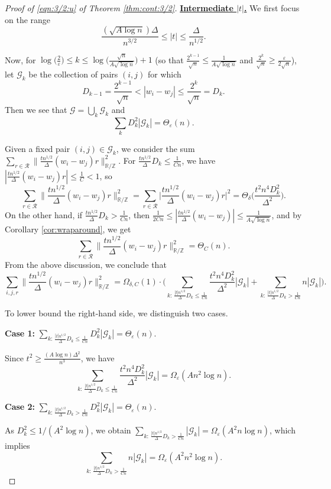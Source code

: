 \documentclass[reqno]{amsart}
\newcommand\R{{\mathbb{R}}}
\newcommand\Z{{\mathbb{Z}}}
\newcommand\eps{{\varepsilon}}
\newcommand\CG{{\mathcal G}}
\newcommand\CR{{\mathcal R}}
\theoremstyle{plain}
\theoremstyle{definition}
\begin{document}
\begin{proof}[Proof of \eqref{eqn:3/2:u} of Theorem \ref{thm:cont:3/2}]
\underline{\bf Intermediate $|t|$.}  
We first focus on the range
\[
\frac{(\sqrt{A\log n})\Delta}{n^{3/2}} \le |t| \le \frac{\Delta}{n^{1/2}}.
\]

Now, for $\log \big(\frac{2}{\eps}\big)\le k \le \log\Big( \frac{\sqrt{n}}{A \sqrt{\log n}} \Big)+1$ (so that $\frac{2^{k-1}}{\sqrt{n}} \le \frac{1}{A\sqrt{\log n}}$ and $\frac{2^{k}}{\sqrt{n}} \ge \frac{\eps}{2\sqrt{n}}$), let $\CG_{k}$ be the collection of pairs $(i,j)$ for which
\[
D_{k-1} = \frac{2^{k-1}}{\sqrt{n}} < |w_{i}-w_{j}| \le \frac{2^{k}}{\sqrt{n}} = D_{k}.
\]
Then we see that $\CG=\bigcup_{k}\CG_{k}$ and
\[
\sum_{k} D_{k}^{2} |\CG_{k}| =\Theta_{\eps}(n).
\]

Given a fixed pair $(i,j)\in \CG_{k}$, we consider the sum $\sum_{r\in \CR} \|\frac{t n^{1/2}}{\Delta} (w_{i}-w_{j})r\|_{\R/\Z}^{2}$. For $\frac{t n^{1/2}}{\Delta}D_{k}\le \frac{1}{C n}$, we have $|\frac{t n^{1/2}}{\Delta} (w_{i}-w_{j})r|\le \frac{1}{C}<1$, so
\[
\sum_{r\in \CR}\Big\|\frac{t n^{1/2}}{\Delta} (w_{i}-w_{j})r\Big\|^{2}_{\R/\Z} = \sum_{r\in \CR}\Big|\frac{t n^{1/2}}{\Delta} (w_{i}-w_{j})r\Big|^2 =\Theta_{\delta} \Big(\frac{t^{2}n^{4}D^{2}_{k}}{\Delta^{2}}\Big).
\]
On the other hand, if $\frac{tn^{1/2}}{\Delta}D_{k}> \frac{1}{Cn}$, then $\frac{1}{2Cn}\le |\frac{tn^{1/2}}{\Delta}(w_{i}-w_{j})|\le \frac{1}{A\sqrt{\log n}}$, and by Corollary \ref{cor:wraparound}, we get
\[
\sum_{r\in \CR} \Big\|\frac{tn^{1/2}}{\Delta} (w_{i}-w_{j})r\Big\|_{\R/\Z}^{2} =\Theta_{C}(n).
\]
From the above discussion, we conclude that
\[
\sum_{i,j,r} \Big\|\frac{tn^{1/2}}{\Delta} (w_{i}-w_{j})r\Big\|_{\R/\Z}^{2}
=\Omega_{\delta,C}(1)\cdot
\Big(
\sum_{k: \, \frac{|t|n^{1/2}}{\Delta}D_{k} \le \frac{1}{Cn}} \frac{t^2 n^{4} D_{k}^{2}}{\Delta^2} |\CG_{k}|
+ \sum_{k: \, \frac{|t|n^{1/2}}{\Delta}D_{k}>\frac{1}{Cn}} n |\CG_{k}|\Big).
\]

To lower bound the right-hand side, we distinguish two cases.

\medskip
\noindent\textbf{Case 1:} $\sum_{k: \, \frac{|t|n^{1/2}}{\Delta}D_{k} \le \frac{1}{Cn}} D_{k}^{2} |\CG_{k}| =\Theta_{\eps}(n)$.

Since $t^2 \ge \frac{(A\log n)\Delta^{2}}{n^{3}}$, we have
\[
\sum_{k: \, \frac{|t|n^{1/2}}{\Delta}D_{k} \le \frac{1}{Cn}} \frac{t^2 n^{4} D_{k}^{2}}{\Delta^{2}} |\CG_{k}|
=\Omega_{\eps}(An^{2}\log n).
\]

\medskip
\noindent\textbf{Case 2:} $\sum_{k:\, \frac{|t|n^{1/2}}{\Delta}D_{k} > \frac{1}{Cn}} D_{k}^{2} |\CG_{k}| =\Theta_{\eps}(n)$.

As $D^{2}_{k}\le 1/(A^2\log n)$, we obtain $\sum_{k:\, \frac{|t|n^{1/2}}{\Delta}D_{k} > \frac{1}{Cn}} |\CG_{k}|= \Omega_{\eps}(A^2 n \log n)$,
which implies
\[
\sum_{k:\, \frac{|t|n^{1/2}}{\Delta}D_{k} > \frac{1}{Cn}} n |\CG_{k}|
=\Omega_{\eps}(A^2 n^{2}\log n).
\]


\end{proof}
\end{document}
